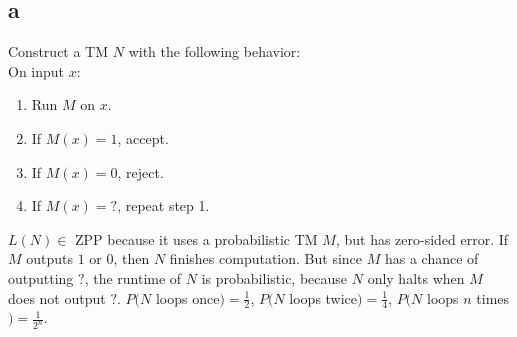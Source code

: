 \documentclass[letterpaper,notitlepage,twoside]{article}
\begin{document}
\subsection*{a}
Construct a TM $N$ with the following behavior: \\
On input $x$:
\begin{enumerate}
  \item Run $M$ on $x$.
  \item If $M(x) = 1$, accept.
  \item If $M(x) = 0$, reject.
  \item If $M(x) = ?$, repeat step 1.
\end{enumerate}
$L(N) \in$ ZPP because it uses a probabilistic TM $M$, but has zero-sided error. If $M$ outputs $1$ or $0$, then $N$ finishes computation. But since $M$ has a chance of outputting $?$, the runtime of $N$ is probabilistic, because $N$ only halts when $M$ does not output $?$. $P(N$ loops once$) = \frac{1}{2}$, $P(N$ loops twice$) = \frac{1}{4}$, $P(N$ loops $n$ times$) = \frac{1}{2^n}$.
\end{document}
